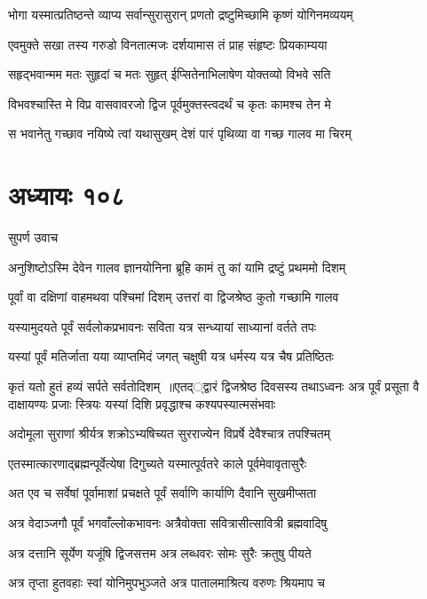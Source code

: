 \twolineshloka
{भोगा यस्मात्प्रतिष्ठन्ते व्याप्य सर्वान्सुरासुरान्}
{प्रणतो द्रष्टुमिच्छामि कृष्णं योगिनमव्ययम्}


\twolineshloka
{एवमुक्ते सखा तस्य गरुडो विनतात्मजः}
{दर्शयामास तं प्राह संहृष्टः प्रियकाम्यया}


\twolineshloka
{सहृद्भवान्मम मतः सुहृदां च मतः सुहृत्}
{ईप्सितेनाभिलाषेण योक्तव्यो विभवे सति}


\twolineshloka
{विभवश्चास्ति मे विप्र वासवावरजो द्विज}
{पूर्वमुक्तस्त्वदर्थं च कृतः कामश्च तेन मे}


\twolineshloka
{स भवानेतु गच्छाव नयिष्ये त्वां यथासुखम्}
{देशं पारं पृथिव्या वा गच्छ गालव मा चिरम्}


\chapter{अध्यायः १०८}
\twolineshloka
{सुपर्ण उवाच}
{}


\twolineshloka
{अनुशिष्टोऽस्मि देवेन गालव ज्ञानयोनिना}
{ब्रूहि कामं तु कां यामि द्रष्टुं प्रथममो दिशम्}


\twolineshloka
{पूर्वां वा दक्षिणां वाहमथवा पश्चिमां दिशम्}
{उत्तरां वा द्विजश्रेष्ठ कुतो गच्छामि गालव}


\twolineshloka
{यस्यामुदयते पूर्वं सर्वलोकप्रभावनः}
{सविता यत्र सन्ध्यायां साध्यानां वर्तते तपः}


\twolineshloka
{यस्यां पूर्वं मतिर्जाता यया व्याप्तमिदं जगत्}
{चक्षुषी यत्र धर्मस्य यत्र चैष प्रतिष्ठितः}


कृतं यतो हुतं हव्यं सर्पते सर्वतोदिशम् ॥एतद््द्वारं द्विजश्रेष्ठ दिवसस्य तथाऽध्वनः
\twolineshloka
{अत्र पूर्वं प्रसूता वै दाक्षायण्यः प्रजाः स्त्रियः}
{यस्यां दिशि प्रवृद्धाश्च कश्यपस्यात्मसंभवाः}


\twolineshloka
{अदोमूला सुराणां श्रीर्यत्र शक्रोऽभ्यषिच्यत}
{सुरराज्येन विप्रर्षे देवैश्चात्र तपश्चितम्}


\twolineshloka
{एतस्मात्कारणाद्ब्रह्मन्पूर्वेत्येषा दिगुच्यते}
{यस्मात्पूर्वतरे काले पूर्वमेवावृतासुरैः}


\twolineshloka
{अत एव च सर्वेषां पूर्वामाशां प्रचक्षते}
{पूर्वं सर्वाणि कार्याणि दैवानि सुखमीप्सता}


\twolineshloka
{अत्र वेदाञ्जगौ पूर्वं भगवाँल्लोकभावनः}
{अत्रैवोक्ता सवित्रासीत्सावित्री ब्रह्मवादिषु}


\twolineshloka
{अत्र दत्तानि सूर्येण यजूंषि द्विजसत्तम}
{अत्र लब्धवरः सोमः सुरैः क्रतुषु पीयते}


\twolineshloka
{अत्र तृप्ता हुतवहाः स्वां योनिमुपभुञ्जते}
{अत्र पातालमाश्रित्य वरुणः श्रियमाप च}


